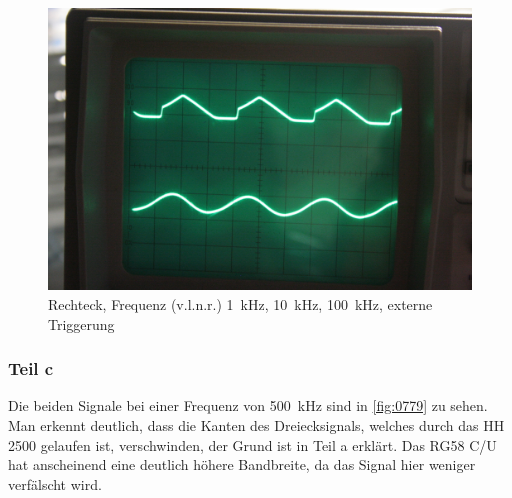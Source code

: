 \begin{figure}[htbp]
\begin{minipage}{.3\linewidth}
	\includegraphics[width=\linewidth]{Fotos/IMG_0778-1500.jpg}
	\end{minipage}

	\caption{%
		Rechteck, Frequenz (v.l.n.r.) \SI{1}{\kilo\hertz}, \SI{10}{\kilo\hertz},
		\SI{100}{\kilo\hertz}, externe Triggerung
	}
	\label{fig:0776-0778}
\end{figure}

\subsubsection{Teil c}

Die beiden Signale bei einer Frequenz von \SI{500}{\kilo\hertz} sind in 
\ref{fig:0779} zu sehen. Man erkennt deutlich, dass die Kanten des Dreiecksignals, welches durch das HH 2500 gelaufen ist, verschwinden, der Grund ist in Teil a erklärt. Das RG58 C/U hat anscheinend eine deutlich höhere Bandbreite, da das Signal hier weniger verfälscht wird.

